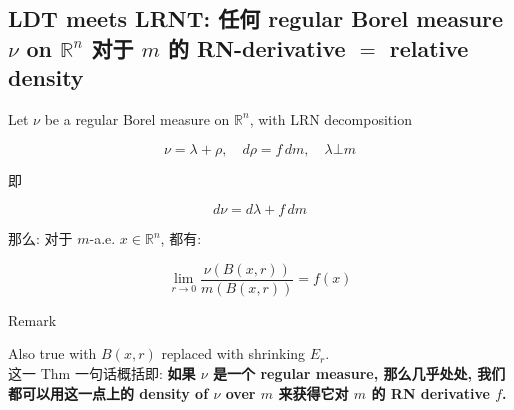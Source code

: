 \subsection{\texorpdfstring{LDT meets LRNT: 任何 regular Borel measure \(\nu\) on \(\mathbb{R}^{n}\) 对于 \(m\) 的 RN-derivative \(=\) relative density}{LDT meets LRNT: 任何 regular Borel measure \textbackslash nu on \textbackslash mathbb\{R\}\^{}\{n\} 对于 m 的 RN-derivative = relative density}}\label{ldt-meets-lrnt-ux4efbux4f55-regular-borel-measure-nu-on-mathbbrn-ux5bf9ux4e8e-m-ux7684-rn-derivative-relative-density}

\begin{theorem}{}

Let \(\nu\) be a regular Borel measure on \(\mathbb{R}^{n}\), with LRN decomposition

\[\nu = \lambda + \rho,\quad d\rho = f\, dm,\quad\lambda\bot m\]

即

\[d\nu = d\lambda + f\, dm\]

那么: 对于 \(m\)-a.e. \(x \in \mathbb{R}^{n}\), 都有:

\[\lim\limits_{r\rightarrow 0}\frac{\nu(B(x,r))}{m(B(x,r))} = f(x)\]

\end{theorem}

\begin{qlremark}{Remark}

Also true with \(B(x,r)\) replaced with shrinking \(E_{r}\).\\
这一 Thm 一句话概括即: \textbf{如果 \(\nu\) 是一个 regular measure, 那么几乎处处, 我们都可以用这一点上的 density of \(\nu\) over \(m\) 来获得它对 \(m\) 的 RN derivative \(f\).}

\end{qlremark}

